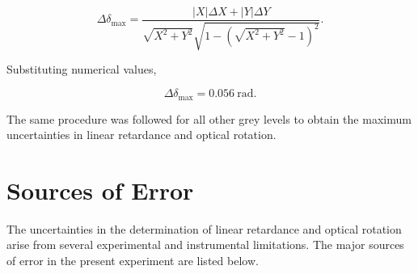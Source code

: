 \begin{equation}
\Delta\delta_{\max}
=
\frac{|X|\Delta X+|Y|\Delta Y}
{\sqrt{X^2+Y^2}\sqrt{1-(\sqrt{X^2+Y^2}-1)^2}}.
\end{equation}

Substituting numerical values,

\begin{equation}
\Delta\delta_{\max}=0.056~\text{rad}.
\end{equation}

The same procedure was followed for all other grey levels to obtain the maximum uncertainties in linear retardance and optical rotation.
\section{Sources of Error}

The uncertainties in the determination of linear retardance and optical rotation arise from several experimental and instrumental limitations. The major sources of error in the present experiment are listed below.

